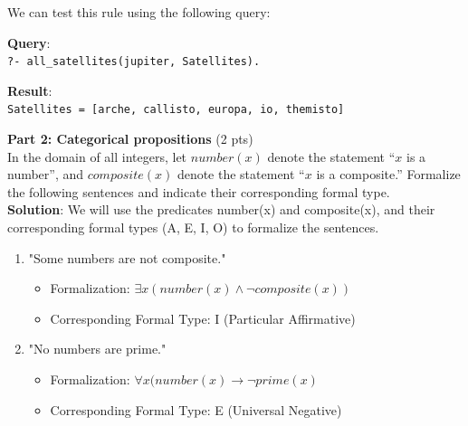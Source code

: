 \documentclass[12pt]{article}
\begin{document}
\begin{spacing}{1.5}
\begin{enumerate}
		      We can test this rule using the following query:
		      		      		      		      		      		      		      		      
		      \textbf{Query}:\\
		      \texttt{?- all\_satellites(jupiter, Satellites).}
		      		      		      		      		      		      		      		      
		      \textbf{Result}:\\
		      \texttt{Satellites = [arche, callisto, europa, io, themisto]}\\
	\end{enumerate}
								
	\noindent \textbf{Part 2: Categorical propositions} (2 pts)\\
	In the domain of all integers, let $number(x)$ denote the statement “$x$ is a number”, and $composite(x)$ denote the statement “$x$ is a composite.” Formalize the following sentences and indicate their corresponding formal type.\\
							
	\textbf{Solution}: We will use the predicates number(x) and composite(x), and their corresponding formal types (A, E, I, O) to formalize the sentences.
								
	\begin{enumerate}
		\item "Some numbers are not composite."
		      		      		      		      		      		      		      
		      \begin{itemize}
		      	\item Formalization: $\exists x(number(x) \land \neg composite(x))$
		      	\item Corresponding Formal Type: I (Particular Affirmative)
		      \end{itemize}
		      		      		      		      		      		      		        
		\item "No numbers are prime."
		      		      		      		      		      		      		      
		      \begin{itemize}
		      	\item Formalization: $\forall x (number(x) \rightarrow \neg prime(x)$
		      	\item Corresponding Formal Type: E (Universal Negative)
		      \end{itemize}
		      		      		      		      		      		      		        

\end{enumerate}
\end{spacing}
\end{document}
